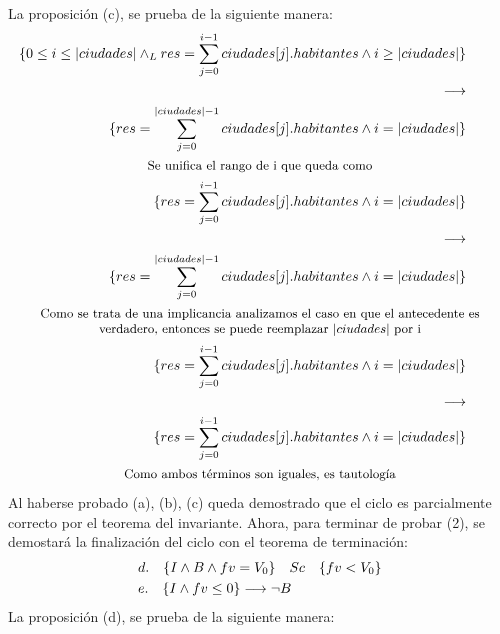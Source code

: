 \documentclass[10pt,a4paper,fleqn]{article}
\begin{document}
\indent
La proposición (c), se prueba de la siguiente manera:
\begin{align*}
    \{ \invariante{i} \land i \geq |ciudades| \}\\
     \implica \\
    \{ res = \sum\limits_{j=0}^{|ciudades| - 1} ciudades[j].habitantes \land i = |ciudades| \}\\
     \shortintertext{\parbox{\textwidth}{\centering \small {Se unifica el rango de i que queda como}}} \notag
     \{ res = \sum\limits_{j=0}^{i - 1} ciudades[j].habitantes \land i = |ciudades| \}\\
     \implica \\
    \{ res = \sum\limits_{j=0}^{|ciudades| - 1} ciudades[j].habitantes \land i = |ciudades| \}\\
\shortintertext{\parbox{\textwidth}{\centering \small {Como se trata de una implicancia analizamos el caso en que el antecedente es verdadero, entonces se puede reemplazar $|ciudades|$ por i}}} \notag
     \{ res = \sum\limits_{j=0}^{i - 1} ciudades[j].habitantes \land i = |ciudades| \}\\
     \implica \\
    \{ res = \sum\limits_{j=0}^{i - 1} ciudades[j].habitantes \land i = |ciudades| \}\\
	\shortintertext{\parbox{\textwidth}{\centering \small {Como ambos términos son iguales, es tautología}}}
\end{align*}
\indent
Al haberse probado (a), (b), (c) queda demostrado que el ciclo es parcialmente correcto por el teorema del invariante. Ahora, para terminar de probar (2), se demostará la finalización del ciclo con el teorema de terminación:
\begin{align*}
    &d.\quad \{ I \land B \land fv = V_{0} \}\quad Sc \quad\{ fv < V_{0} \} \\
    &e.\quad \{ I \land fv \leq 0 \} \longrightarrow \neg B\\
\end{align*}
\indent
La proposición (d), se prueba de la siguiente manera:
\end{document}
